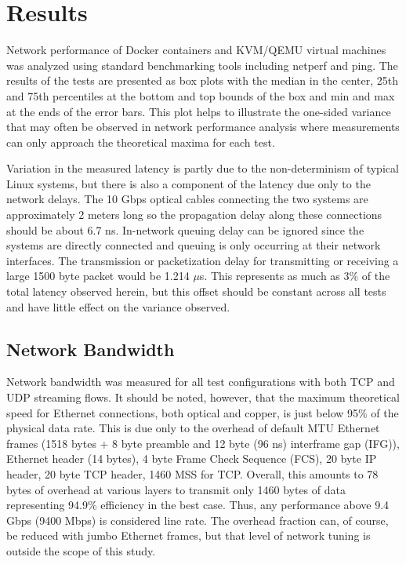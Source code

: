 \chapter{Results}
\label{cha:results}
\label{sec:results}
Network performance of Docker containers and KVM/QEMU virtual machines was analyzed using standard benchmarking tools including netperf and ping.  
The results of the tests are presented as box plots with the median in the center, 25th and 75th percentiles at the bottom and top bounds of the box and min and max at the ends of the error bars.
This plot helps to illustrate the one-sided variance that may often be observed in network performance analysis where measurements can only approach the theoretical maxima for each test.  

Variation in the measured latency is partly due to the non-determinism of typical Linux systems, but there is also a component of the latency due only to the network delays.
The 10 Gbps optical cables connecting the two systems are approximately 2 meters long so the propagation delay along these connections should be about 6.7 ns.
In-network queuing delay can be ignored since the systems are directly connected and queuing is only occurring at their network interfaces.
The transmission or packetization delay for transmitting or receiving a large 1500 byte packet would be 1.214 $\mu$s.
This represents as much as 3\% of the total latency observed herein, but this offset should be constant across all tests and have little effect on the variance observed. 

\section{Network Bandwidth} %
\label{sec:networkbandwidth}
Network bandwidth was measured for all test configurations with both TCP and UDP streaming flows.
It should be noted, however, that the maximum theoretical speed for Ethernet connections, both optical and copper, is just below 95\% of the physical data rate.
This is due only to the overhead of default MTU Ethernet frames (1518 bytes + 8 byte preamble and 12 byte (96 ns) interframe gap (IFG)), Ethernet header (14 bytes), 4 byte Frame Check Sequence (FCS), 20 byte IP header, 20 byte TCP header, 1460 MSS for TCP.
Overall, this amounts to 78 bytes of overhead at various layers to transmit only 1460 bytes of data representing 94.9\% efficiency in the best case.  
Thus, any performance above 9.4 Gbps (9400 Mbps) is considered line rate.  
The overhead fraction can, of course, be reduced with jumbo Ethernet frames, but that level of network tuning is outside the scope of this study.

